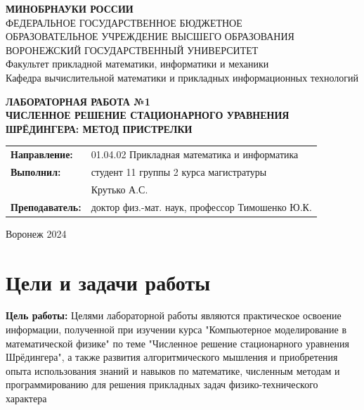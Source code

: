 \documentclass[a4paper, 12pt]{article}
\begin{document}
\begin{center}
\textbf{МИНОБРНАУКИ РОССИИ}\\
ФЕДЕРАЛЬНОЕ ГОСУДАРСТВЕННОЕ БЮДЖЕТНОЕ \\
ОБРАЗОВАТЕЛЬНОЕ УЧРЕЖДЕНИЕ ВЫСШЕГО ОБРАЗОВАНИЯ \\
ВОРОНЕЖСКИЙ ГОСУДАРСТВЕННЫЙ УНИВЕРСИТЕТ \\
Факультет прикладной математики, информатики и механики\\
Кафедра вычислительной математики и прикладных информационных технологий
\end{center}

\vspace{2cm}
\begin{center}
\textbf{ЛАБОРАТОРНАЯ РАБОТА №1}\\
\textbf{ЧИСЛЕННОЕ РЕШЕНИЕ СТАЦИОНАРНОГО УРАВНЕНИЯ ШРЁДИНГЕРА: МЕТОД ПРИСТРЕЛКИ}
\end{center}

\vspace{3cm}
\begin{flushright}
\begin{tabular}{l l}
\textbf{Направление:} & 01.04.02 \textendash{} Прикладная математика и информатика \\
\textbf{Выполнил:} & студент 11 группы 2 курса магистратуры \\
& Крутько А.С. \\
\textbf{Преподаватель:} & доктор физ.-мат. наук, профессор Тимошенко Ю.К.
\end{tabular}
\end{flushright}

\vspace{3cm}
\begin{center}
Воронеж 2024
\end{center}

\newpage
\tableofcontents

\newpage
\section{Цели и задачи работы}\label{sec:---}
\textbf{Цель работы:}
Целями лабораторной работы являются практическое освоение информации, полученной при изучении курса "Компьютерное моделирование в математической физике" по теме "Численное решение стационарного уравнения Шрёдингера", а также развития алгоритмического мышления и приобретения опыта использования знаний и навыков по математике, численным методам и программированию для решения прикладных задач физико-технического характера
\end{document}
